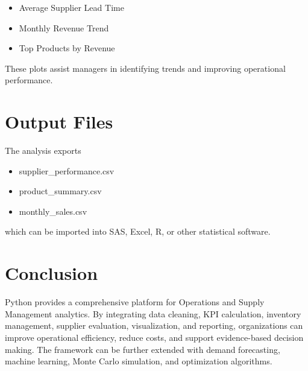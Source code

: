\documentclass[11pt,a4paper]{article}
\begin{document}
\begin{itemize}
\item Average Supplier Lead Time
\item Monthly Revenue Trend
\item Top Products by Revenue
\end{itemize}

These plots assist managers in identifying trends and improving operational performance.

\section{Output Files}

The analysis exports

\begin{itemize}
\item supplier\_performance.csv
\item product\_summary.csv
\item monthly\_sales.csv
\end{itemize}

which can be imported into SAS, Excel, R, or other statistical software.

\section{Conclusion}

Python provides a comprehensive platform for Operations and Supply Management analytics. By integrating data cleaning, KPI calculation, inventory management, supplier evaluation, visualization, and reporting, organizations can improve operational efficiency, reduce costs, and support evidence-based decision making. The framework can be further extended with demand forecasting, machine learning, Monte Carlo simulation, and optimization algorithms.
\end{document}
